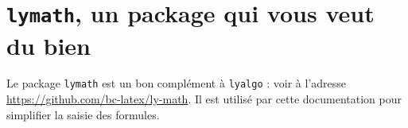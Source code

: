 \documentclass[12pt,a4paper]{article}
\begin{document}
\section{\texttt{lymath}, un package qui vous veut du bien}

Le package \verb+lymath+ est un bon complément à \verb+lyalgo+ : voir à l'adresse \url{https://github.com/bc-latex/ly-math}. 
Il est utilisé par cette documentation pour simplifier la saisie des formules.
\end{document}
